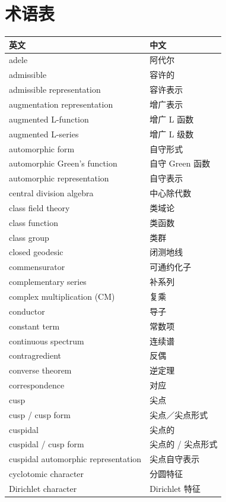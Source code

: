 \chapter*{术语表}
{\small\raggedright
\begin{longtable}{@{}p{}p{}@{}}
\toprule
\textbf{英文} & \textbf{中文}\\
\midrule
\endhead
\bottomrule
\endfoot
adele & 阿代尔 \\
admissible & 容许的 \\
admissible representation & 容许表示 \\
augmentation representation & 增广表示 \\
augmented L-function & 增广 L 函数 \\
augmented L-series & 增广 L 级数 \\
automorphic form & 自守形式 \\
automorphic Green's function & 自守 Green 函数 \\
automorphic representation & 自守表示 \\
central division algebra & 中心除代数 \\
class field theory & 类域论 \\
class function & 类函数 \\
class group & 类群 \\
closed geodesic & 闭测地线 \\
commensurator & 可通约化子 \\
complementary series & 补系列 \\
complex multiplication (CM) & 复乘 \\
conductor & 导子 \\
constant term & 常数项 \\
continuous spectrum & 连续谱 \\
contragredient & 反偶 \\
converse theorem & 逆定理 \\
correspondence & 对应 \\
cusp & 尖点 \\
cusp / cusp form & 尖点／尖点形式 \\
cuspidal & 尖点的 \\
cuspidal / cusp form & 尖点的 / 尖点形式 \\
cuspidal automorphic representation & 尖点自守表示 \\
cyclotomic character & 分圆特征 \\
Dirichlet character & Dirichlet 特征 \\

\end{longtable}}
